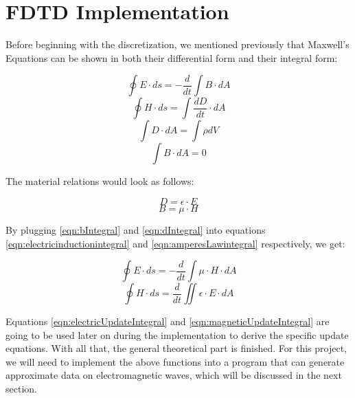 \section{FDTD Implementation}

Before beginning with the discretization, we mentioned previously that Maxwell's Equations can be shown in both their differential form and their integral form:


\begin{equation}
	\label{eqn:electricinductionintegral}
	\oint E \cdot ds = - \frac{d}{dt} \int B \cdot dA
\end{equation}
\begin{equation}
	\label{eqn:amperesLawintegral}
	\oint H \cdot ds = \int \frac{dD}{dt} \cdot dA
\end{equation}
\begin{equation}
	\label{eqn:magneticDivergenceintegral}
	\int D \cdot dA = \int \rho dV
\end{equation}
\begin{equation}
	\label{eqn:gausslawintegral}
	\int B \cdot dA = 0
\end{equation}

The material relations would look as follows:

\begin{equation}
	\label{eqn:dIntegral}
	D = \epsilon \cdot E
\end{equation}
\begin{equation}
	\label{eqn:bIntegral}
	B = \mu \cdot H
\end{equation}

By plugging \ref{eqn:bIntegral} and \ref{eqn:dIntegral} into equations \ref{eqn:electricinductionintegral} and \ref{eqn:amperesLawintegral} respectively, we get:

\begin{equation}
	\label{eqn:electricUpdateIntegral}
	\oint E \cdot ds = - \frac{d}{dt} \int \mu \cdot H \cdot dA
\end{equation}
\begin{equation}
	\label{eqn:magneticUpdateIntegral}
	\oint H \cdot ds = \frac{d}{dt} \iint \epsilon \cdot E \cdot dA
\end{equation}

Equations \ref{eqn:electricUpdateIntegral} and \ref{eqn:magneticUpdateIntegral} are going to be used later on during the implementation to derive the specific update equations. With all that, the general theoretical part is finished. For this project, we will need to implement the above functions into a program that can generate approximate data on electromagnetic waves, which will be discussed in the next section.

